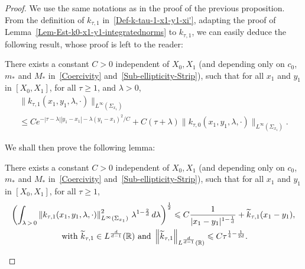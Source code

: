 \documentclass[AHL,Unicode,longabstracts]{cedram}
\newcommand*\R{\mathbb{R}}
\newcommand{\norm}[1]{\left\Vert#1\right\Vert}
\renewcommand{\leq}{\leqslant}
\renewcommand{\geq}{\geqslant}
\renewcommand{\tilde}{\widetilde}
\let\oldtilde\tilde
\renewcommand*{\tilde}[1]{\mathchoice{\widetilde{#1}}{\widetilde{#1}}{\oldtilde{#1}}{\oldtilde{#1}}}
\begin{document}
\begin{proof}
We use the same notations as in the proof of the previous proposition. From the definition of $k_{\tau,1}$ in~\eqref{Def-k-tau-1-x1-y1-xi'}, adapting the proof of Lemma~\ref{Lem-Est-k0-x1-y1-integratednorms} to $k_{\tau,1}$, we can easily deduce the following result, whose proof is left to the reader:

\begin{lemm}\label{Lem-Est-k-1-x1-y1}
There exists a constant $C >0$ independent of $X_0, X_1$ (and depending only on $c_0$, $m_*$ and $M_*$ in~\eqref{Coercivity} and~\eqref{Sub-ellipticity-Strip}), such that for all $x_1$ and $y_1$ in $[X_0, X_1]$, for all $\tau \geq 1$, and $\lambda >0$,
\begin{multline}\label{Est-k-tau-1-x1-y1}
\| k_{\tau, 1}(x_1,y_1,\lambda, \cdot) \|_{L^\infty\left(\Sigma_{x_1}\right)}\\ 
\leq C e^{-|\tau - \lambda| | y_1 - x_1 | - \lambda (y_1 - x_1)^2/C }
+ C (\tau + \lambda) \| k_{\tau, 0}(x_1,y_1,\lambda, \cdot) \|_{L^\infty\left(\Sigma_{x_1}\right)}.
\end{multline}
\end{lemm}

We shall then prove the following lemma:
\begin{lemm}\label{Lem-Est-k1-x1-y1-integratednorms}
There exists a constant $C >0$ independent of $X_0, X_1$ (and depending only on $c_0$, $m_*$ and $M_*$ in~\eqref{Coercivity} and~\eqref{Sub-ellipticity-Strip}), such that for all $x_1$ and $y_1$ in $[X_0, X_1]$, for all $\tau \geq 1$,
\begin{multline}\label{est-k1-x1-y1-Lp-L2}
\left(\int_{\lambda\,>\,0} \norm{k_{\tau,1}(x_1, y_1,\lambda, \cdot) }^2_{L^\infty(\Sigma_{x_1})} \, \lambda^{1 -\frac{2}{d}}\, d\lambda\right)^{\frac{1}{2}}
\leq C\frac{1}{|x_1-y_1|^{1-\frac{1}{d}}} + \tilde k_{\tau,1}(x_1-y_1),
\\
 \text{ with }\tilde k_{\tau,1} \in L^{\frac{d}{d-1}} (\R)\text{ and }
\left\|\tilde k_{\tau,1}\right\|_{L^{\frac{d}{d-1}} (\R)} \leq C \tau^{\frac{1}{4}-\frac{1}{2d}}.
\end{multline}
\end{lemm}


\end{proof}
\end{document}
